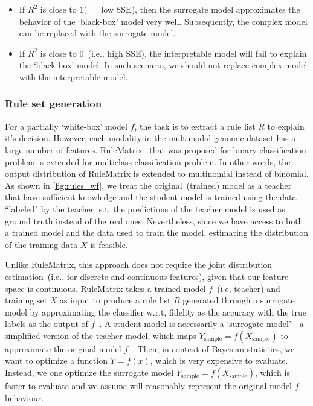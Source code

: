 \begin{itemize}[noitemsep]
    \item If $R^2$ is close to $1(=$ low $\mathrm{SSE}$), then the surrogate model approximates the behavior of the `black-box' model very well. Subsequently, the complex model can be replaced with the surrogate model. 
    \item If $R^2$ is close to 0~(i.e., high SSE), the interpretable model will fail to explain the `black-box' model. In such scenario, we should not replace  complex model with the interpretable model.
\end{itemize}

\subsubsection{Rule set generation}
For a partially `white-box' model ${f}$, the task is to extract a rule list $R$ to explain it's decision. However, each modality in the multimodal genomic dataset has a large number of features. RuleMatrix~\cite{ming2018rulematrix} that was proposed for binary classification problem is extended for multiclass classification problem. In other words, the output distribution of RuleMatrix is extended to multinomial instead of binomial. 
As shown in \cref{fig:rules_wf}, we treat the original~(trained) model as a teacher that have sufficient knowledge and the student model is trained using the data ``labeled" by the teacher, s.t. the predictions of the teacher model is used as ground truth instead of the real ones. Nevertheless, since we have access to both a trained model and the data used to train the model, estimating the distribution of the training data ${X}$ is feasible. 

\hspace*{3.5mm} Unlike RuleMatrix, this approach does not require the joint distribution estimation~(i.e., for discrete and continuous features), given that our feature space is continuous. RuleMatrix takes a trained model ${f}$~(i.e, teacher) and training set $X$ as input to produce a rule list $R$ generated through a surrogate model by approximating the classifier w.r.t, fidelity as the accuracy with the true labels as the output of ${f}$~\cite{ming2018rulematrix}. A student model is necessarily a `surrogate model' - a simplified version of the teacher model, which maps $Y_\text{sample}=f(X_\text{sample})$ to approximate the original model $f$~\cite{forrester2008engineering}. Then, in context of Bayesian statistics, we want to optimize a function $Y=f(x)$, which is very expensive to evaluate. Instead, we one optimize the surrogate model $Y_\text{sample}=f(X_\text{sample})$, which is faster to evaluate and we assume will reasonably represent the original model $f$ behaviour. 


